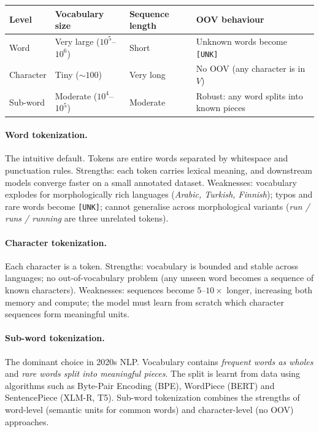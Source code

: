 \begin{center}
\begin{tabular}{|l|l|l|l|}
\hline
\textbf{Level} & \textbf{Vocabulary size} & \textbf{Sequence length} & \textbf{OOV behaviour} \\
\hline
Word & Very large ($10^5$--$10^6$) & Short & Unknown words become \texttt{[UNK]} \\
Character & Tiny ($\sim 100$) & Very long & No OOV (any character is in $V$) \\
Sub-word & Moderate ($10^4$--$10^5$) & Moderate & Robust: any word splits into known pieces \\
\hline
\end{tabular}
\end{center}

\paragraph{Word tokenization.}
The intuitive default. Tokens are entire words separated by whitespace and punctuation rules. Strengths: each token carries lexical meaning, and downstream models converge faster on a small annotated dataset. Weaknesses: vocabulary explodes for morphologically rich languages (\emph{Arabic, Turkish, Finnish}); typos and rare words become \texttt{[UNK]}; cannot generalise across morphological variants (\emph{run / runs / running} are three unrelated tokens).

\paragraph{Character tokenization.}
Each character is a token. Strengths: vocabulary is bounded and stable across languages; no out-of-vocabulary problem (any unseen word becomes a sequence of known characters). Weaknesses: sequences become $5$--$10\times$ longer, increasing both memory and compute; the model must learn from scratch which character sequences form meaningful units.

\paragraph{Sub-word tokenization.}
The dominant choice in 2020s NLP. Vocabulary contains \emph{frequent words as wholes} and \emph{rare words split into meaningful pieces}. The split is learnt from data using algorithms such as Byte-Pair Encoding (BPE), WordPiece (BERT) and SentencePiece (XLM-R, T5). Sub-word tokenization combines the strengths of word-level (semantic units for common words) and character-level (no OOV) approaches.


